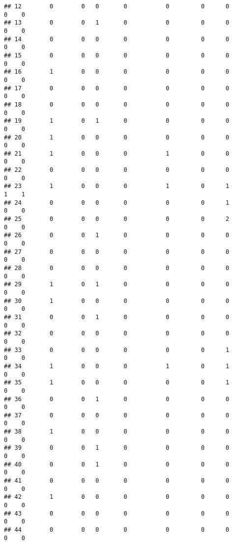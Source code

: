 \documentclass[
]{article}
\begin{document}
\begin{verbatim}
## 12        0        0   0       0           0         0      0        0    0
## 13        0        0   1       0           0         0      0        0    0
## 14        0        0   0       0           0         0      0        0    0
## 15        0        0   0       0           0         0      0        0    0
## 16        1        0   0       0           0         0      0        0    0
## 17        0        0   0       0           0         0      0        0    0
## 18        0        0   0       0           0         0      0        0    0
## 19        1        0   1       0           0         0      0        0    0
## 20        1        0   0       0           0         0      0        0    0
## 21        1        0   0       0           1         0      0        0    0
## 22        0        0   0       0           0         0      0        0    0
## 23        1        0   0       0           1         0      1        1    1
## 24        0        0   0       0           0         0      1        0    0
## 25        0        0   0       0           0         0      2        0    0
## 26        0        0   1       0           0         0      0        0    0
## 27        0        0   0       0           0         0      0        0    0
## 28        0        0   0       0           0         0      0        0    0
## 29        1        0   1       0           0         0      0        0    0
## 30        1        0   0       0           0         0      0        0    0
## 31        0        0   1       0           0         0      0        0    0
## 32        0        0   0       0           0         0      0        0    0
## 33        0        0   0       0           0         0      1        0    0
## 34        1        0   0       0           1         0      1        0    0
## 35        1        0   0       0           0         0      1        0    0
## 36        0        0   1       0           0         0      0        0    0
## 37        0        0   0       0           0         0      0        0    0
## 38        1        0   0       0           0         0      0        0    0
## 39        0        0   1       0           0         0      0        0    0
## 40        0        0   1       0           0         0      0        0    0
## 41        0        0   0       0           0         0      0        0    0
## 42        1        0   0       0           0         0      0        0    0
## 43        0        0   0       0           0         0      0        0    0
## 44        0        0   0       0           0         0      0        0    0

\end{verbatim}
\end{document}
